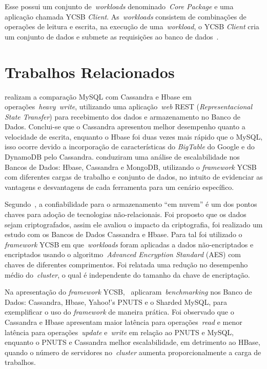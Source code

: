\documentclass[12pt]{article}
\begin{document}
Esse possui um conjunto de~\emph{workloads} denominado~\emph{Core Package} e uma aplicação chamada YCSB \textit{Client}. 
As~\emph{workloads} consistem de combinações de operações de leitura e escrita, na execução de uma~\emph{workload}, o YCSB \textit{Client} cria um conjunto de dados e submete as requisições ao banco de dados~\cite{cooper2010benchmarking}.

\section{Trabalhos Relacionados} 
\label{sec:relacionados}


\cite{jogi2016performance} realizam a comparação MySQL com Cassandra e Hbase em operações~\emph{heavy~\emph{write}}, utilizando uma aplicação~\emph{web} REST (\emph{Representacional State Transfer}) para recebimento dos dados e armazenamento no Banco de Dados. 
Conclui-se que o Cassandra apresentou melhor desempenho quanto a velocidade de escrita, enquanto o Hbase foi duas vezes mais rápido que o MySQL, isso ocorre devido a incorporação de características do \emph{BigTable} do Google e do DynamoDB pelo Cassandra. 
\cite{swaminathan2016quantitative} conduziram uma análise de escalabilidade nos Bancos de Dados: Hbase, Cassandra e MongoDB, utilizando o \textit{framework} YCSB com diferentes cargas de trabalho e conjunto de dados, no intuito de evidenciar as vantagens e desvantagens de cada ferramenta para um cenário específico.

Segundo~\cite{waage2014benchmarking}, a confiabilidade para o armazenamento ``em nuvem'' é um dos pontos chaves para adoção de tecnologias não-relacionais. 
Foi proposto que os dados sejam criptografados, assim ele avaliou o impacto da criptografia, foi realizado um estudo com os Bancos de Dados Cassandra e Hbase. 
Para tal foi utilizado o \emph{framework} YCSB em que~\emph{workloads} foram aplicadas a dados não-encriptados e encriptados usando o algoritmo~\emph{Advanced Encryption Standard} (AES) com chaves de diferentes comprimentos. 
Foi relatada uma redução no desempenho médio do~\emph{cluster}, o qual é independente do tamanho da chave de encriptação.

Na apresentação do \textit{framework} YCSB,~\cite{cooper2010benchmarking} aplicaram~\emph{benchmarking} nos Banco de Dados: Cassandra, Hbase, Yahoo!’s PNUTS e o Sharded MySQL, para exemplificar o uso do \textit{framework} de maneira prática. 
Foi observado que o Cassandra e Hbase apresentam maior latência para operações~\emph{read} e menor latência para operações~\emph{update} e~\emph{write} em relação ao PNUTS e MySQL, enquanto o PNUTS e Cassandra melhor escalabilidade, em detrimento ao HBase, quando o número de servidores no~\emph{cluster} aumenta proporcionalmente a carga de trabalhos.
\end{document}
